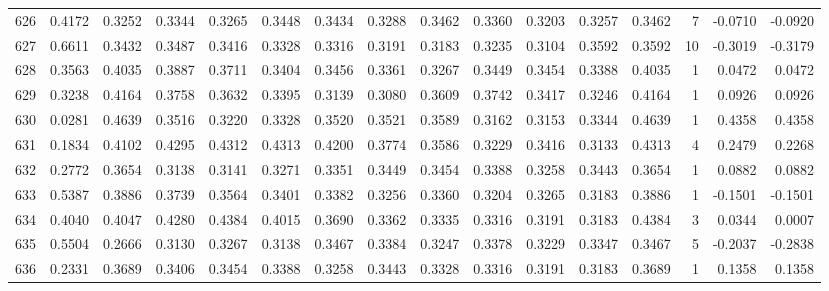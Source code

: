 \begin{tabular}{lrrrrrrrrrrrrrrr}
626 &      0.4172 &  0.3252 &  0.3344 &  0.3265 &  0.3448 &  0.3434 &  0.3288 &  0.3462 &  0.3360 &  0.3203 &   0.3257 &     0.3462 &      7 &                   -0.0710 &                    -0.0920 \\
627 &      0.6611 &  0.3432 &  0.3487 &  0.3416 &  0.3328 &  0.3316 &  0.3191 &  0.3183 &  0.3235 &  0.3104 &   0.3592 &     0.3592 &     10 &                   -0.3019 &                    -0.3179 \\
628 &      0.3563 &  0.4035 &  0.3887 &  0.3711 &  0.3404 &  0.3456 &  0.3361 &  0.3267 &  0.3449 &  0.3454 &   0.3388 &     0.4035 &      1 &                    0.0472 &                     0.0472 \\
629 &      0.3238 &  0.4164 &  0.3758 &  0.3632 &  0.3395 &  0.3139 &  0.3080 &  0.3609 &  0.3742 &  0.3417 &   0.3246 &     0.4164 &      1 &                    0.0926 &                     0.0926 \\
630 &      0.0281 &  0.4639 &  0.3516 &  0.3220 &  0.3328 &  0.3520 &  0.3521 &  0.3589 &  0.3162 &  0.3153 &   0.3344 &     0.4639 &      1 &                    0.4358 &                     0.4358 \\
631 &      0.1834 &  0.4102 &  0.4295 &  0.4312 &  0.4313 &  0.4200 &  0.3774 &  0.3586 &  0.3229 &  0.3416 &   0.3133 &     0.4313 &      4 &                    0.2479 &                     0.2268 \\
632 &      0.2772 &  0.3654 &  0.3138 &  0.3141 &  0.3271 &  0.3351 &  0.3449 &  0.3454 &  0.3388 &  0.3258 &   0.3443 &     0.3654 &      1 &                    0.0882 &                     0.0882 \\
633 &      0.5387 &  0.3886 &  0.3739 &  0.3564 &  0.3401 &  0.3382 &  0.3256 &  0.3360 &  0.3204 &  0.3265 &   0.3183 &     0.3886 &      1 &                   -0.1501 &                    -0.1501 \\
634 &      0.4040 &  0.4047 &  0.4280 &  0.4384 &  0.4015 &  0.3690 &  0.3362 &  0.3335 &  0.3316 &  0.3191 &   0.3183 &     0.4384 &      3 &                    0.0344 &                     0.0007 \\
635 &      0.5504 &  0.2666 &  0.3130 &  0.3267 &  0.3138 &  0.3467 &  0.3384 &  0.3247 &  0.3378 &  0.3229 &   0.3347 &     0.3467 &      5 &                   -0.2037 &                    -0.2838 \\
636 &      0.2331 &  0.3689 &  0.3406 &  0.3454 &  0.3388 &  0.3258 &  0.3443 &  0.3328 &  0.3316 &  0.3191 &   0.3183 &     0.3689 &      1 &                    0.1358 &                     0.1358 \\

\end{tabular}
